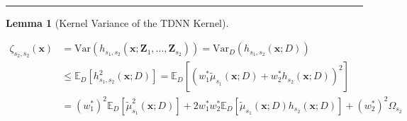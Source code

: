 \documentclass[letterpaper,10pt]{article}
\numberwithin{equation}{section}
\numberwithin{thm}{section}
\newtheorem{lem}{Lemma}
\numberwithin{lem}{section}
\numberwithin{cor}{section}
\newcommand{\E}{\mathbb{E}}
\newcommand{\1}{\mathbbm{1}}
\newcommand{\Var}{\text{Var}}
\newcommand{\Cov}{\text{Cov}}
\begin{document}
\begin{equation}
\begin{aligned}
	\end{aligned}
\end{equation}

\hrule

\begin{lem}[Kernel Variance of the TDNN Kernel]\label{Var_TDNN_k}

\end{lem}

\begin{equation}
	\begin{aligned}
		\zeta_{s_2, s_2}\left(\mathbf{x}\right)
		 & = \Var\left(h_{s_1, s_2}\left(\mathbf{x}; \mathbf{Z}_1, \ldots, \mathbf{Z}_{s_2}\right)\right)
		= \Var_{D}\left(h_{s_1, s_2}\left(\mathbf{x}; D\right)\right)                                     \\
		 & \leq \E_{D}\left[h_{s_1, s_2}^{2}\left(\mathbf{x}; D\right)\right]
		= \E_{D}\left[
			\left(w_{1}^{*}\tilde{\mu}_{s_1}\left(\mathbf{x}; D\right) + w_{2}^{*} h_{s_2}\left(\mathbf{x}; D\right)\right)^2
		\right]                                                                                           \\
		 & = \left(w_{1}^{*}\right)^2\E_{D}\left[\tilde{\mu}_{s_1}^{2}\left(\mathbf{x}; D\right)\right]
		+ 2 w_{1}^{*}w_{2}^{*} \E_{D}\left[\tilde{\mu}_{s_1}\left(\mathbf{x}; D\right) h_{s_2}\left(\mathbf{x}; D\right)\right]
		+ \left(w_{2}^{*}\right)^2\Omega_{s_2}
	\end{aligned}
\end{equation}
\end{document}

